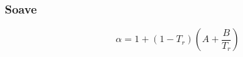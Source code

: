 \subsubsection{Soave \cite{soaveR}}

\begin{equation}
\alpha= 1+\left(1-T_r\right)\left(A + \frac{B}{T_r}\right)
\end{equation}